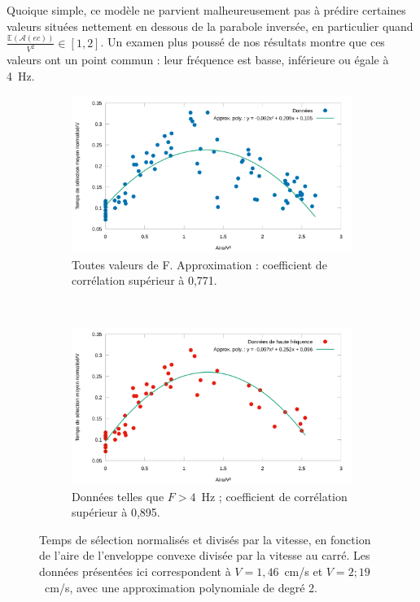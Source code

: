 	Quoique simple, ce modèle ne parvient malheureusement pas à prédire certaines valeurs situées nettement en dessous de la parabole inversée, en particulier quand $\frac{\mathbb{E}(\mathcal{A}(ec))}{V^{2}} \in [1,2]$. Un examen plus poussé de nos résultats montre que ces valeurs ont un point commun : leur fréquence est basse, inférieure ou égale à 4~Hz.


	\begin{figure}[!htb]
		\begin{subfigure}[t]{0.485\textwidth}
			\centering
			\includegraphics[width=\textwidth]{figures/ch4/perf_V_RealArea_lousy_fit}
			\caption[MTSN/V en fonction de l'aire/V² et approximation]{Toutes valeurs de F. Approximation : coefficient de corrélation supérieur à 0,771.}
			\label{fig:perf_V_RealArea_lousy_fit}
		\end{subfigure}
		~
		\begin{subfigure}[t]{0.485\textwidth}
			\centering
			\includegraphics[width=\textwidth]{figures/ch4/perf_V_RealArea_better_fit}
			\caption[MTSN/V en fonction de l'aire/V² et approximation]{Données telles que $F > 4$~Hz ; coefficient de corrélation supérieur à 0,895.}
			\label{fig:perf_V_RealArea_better_fit}
		\end{subfigure}
		\caption[Temps normalisés/V, en fonction de l'aire/V².]{Temps de sélection normalisés et divisés par la vitesse, en fonction de l'aire de l'enveloppe convexe divisée par la vitesse au carré. Les données présentées ici correspondent à $V = 1,46$~cm/s et $V = 2;19$~cm/s, avec une approximation polynomiale de degré 2.}
		\label{fig:perf_V_RealArea_fits}
	\end{figure}
	
